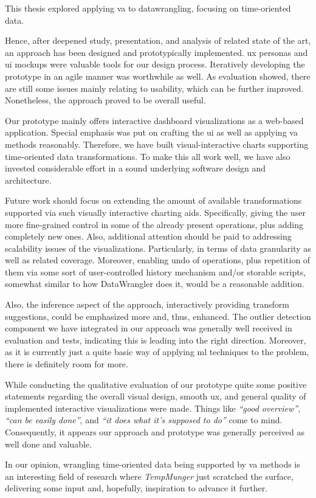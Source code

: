 This thesis explored applying \gls{va} to \gls{datawrangling}, focusing on time-oriented data.

Hence, after deepened study, presentation, and analysis of related state of the art, an approach has been designed and prototypically implemented.
\gls{ux} personas and \gls{ui} mockups were valuable tools for our design process.
Iteratively developing the prototype in an agile manner was worthwhile as well.
As evaluation showed, there are still some issues mainly relating to usability, which can be further improved.
Nonetheless, the approach proved to be overall useful.

Our prototype mainly offers interactive dashboard visualizations as a web-based application.
Special emphasis was put on crafting the \gls{ui} as well as applying \gls{va} methods reasonably.
Therefore, we have built visual-interactive charts supporting time-oriented data transformations.
To make this all work well, we have also invested considerable effort in a sound underlying software design and architecture.

Future work should focus on extending the amount of available transformations supported via such visually interactive charting aids.
Specifically, giving the user more fine-grained control in some of the already present operations, plus adding completely new ones.
Also, additional attention should be paid to addressing scalability issues of the visualizations.
Particularly, in terms of data granularity as well as related coverage.
Moreover, enabling undo of operations, plus repetition of them via some sort of user-controlled history mechanism and/or storable scripts, somewhat similar to how DataWrangler does it, would be a reasonable addition.

Also, the inference aspect of the approach, interactively providing transform suggestions, could be emphasized more and, thus, enhanced.
The outlier detection component we have integrated in our approach was generally well received in evaluation and tests, indicating this is leading into the right direction.
Moreover, as it is currently just a quite basic way of applying \gls{ml} techniques to the problem, there is definitely room for more.

While conducting the qualitative evaluation of our prototype quite some positive statements regarding the overall visual design, smooth \gls{ux}, and general quality of implemented interactive visualizations were made.
Things like \emph{``good overview''}, \emph{``can be easily done''}, and \emph{``it does what it's supposed to do''} come to mind.
Consequently, it appears our approach and prototype was generally perceived as well done and valuable.

In our opinion, wrangling time-oriented data being supported by \gls{va} methods is an interesting field of research where \emph{TempMunger} just scratched the surface, delivering some input and, hopefully, inspiration to advance it further.
